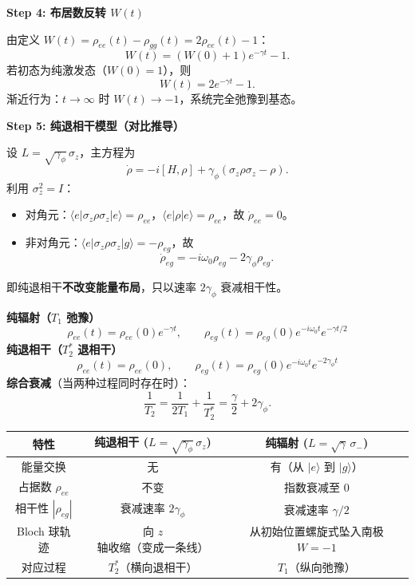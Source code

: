 \begin{derivationbox}[标准解题过程]
\textbf{Step 4: 布居数反转 $W(t)$}

由定义 $W(t) = \rho_{ee}(t) - \rho_{gg}(t) = 2\rho_{ee}(t) - 1$：
\[
W(t) = (W(0)+1)e^{-\gamma t} - 1.
\]
若初态为纯激发态（$W(0)=1$），则
\[
\boxed{W(t) = 2e^{-\gamma t} - 1}.
\]
渐近行为：$t\to\infty$ 时 $W(t)\to -1$，系统完全弛豫到基态。

\textbf{Step 5: 纯退相干模型（对比推导）}

设 $L = \sqrt{\gamma_\phi}\,\sigma_z$，主方程为
\[
\dot{\rho} = -i[H,\rho] + \gamma_\phi\left( \sigma_z \rho \sigma_z - \rho \right).
\]
利用 $\sigma_z^2 = I$：
\begin{itemize}[nosep]
    \item 对角元：$\langle e|\sigma_z \rho \sigma_z|e\rangle = \rho_{ee}$，$\langle e|\rho|e\rangle = \rho_{ee}$，故 $\dot{\rho}_{ee}=0$。
    \item 非对角元：$\langle e|\sigma_z \rho \sigma_z|g\rangle = -\rho_{eg}$，故
    \[
    \dot{\rho}_{eg} = -i\omega_0\rho_{eg} - 2\gamma_\phi\rho_{eg}.
    \]
\end{itemize}
即纯退相干\textbf{不改变能量布局}，只以速率 $2\gamma_\phi$ 衰减相干性。
\end{derivationbox}

\begin{formulabox}[核心结论]
\textbf{纯辐射（$T_1$ 弛豫）}
\[
\rho_{ee}(t) = \rho_{ee}(0)e^{-\gamma t}, \qquad
\rho_{eg}(t) = \rho_{eg}(0)e^{-i\omega_0 t}e^{-\gamma t/2}
\]
\textbf{纯退相干（$T_2^*$ 退相干）}
\[
\rho_{ee}(t) = \rho_{ee}(0), \qquad
\rho_{eg}(t) = \rho_{eg}(0)e^{-i\omega_0 t}e^{-2\gamma_\phi t}
\]
\textbf{综合衰减}（当两种过程同时存在时）：
\[
\frac{1}{T_2} = \frac{1}{2T_1} + \frac{1}{T_2^*}
= \frac{\gamma}{2} + 2\gamma_\phi.
\]
\end{formulabox}

\begin{center}
\renewcommand{\arraystretch}{1.4}
\begin{tabular}{|c|c|c|}
\hline
\textbf{特性} & \textbf{纯退相干} ($L=\sqrt{\gamma_\phi}\,\sigma_z$) & \textbf{纯辐射} ($L=\sqrt{\gamma}\,\sigma_-$) \\
\hline
能量交换 & 无 & 有（从 $|e\rangle$ 到 $|g\rangle$） \\
\hline
占据数 $\rho_{ee}$ & 不变 & 指数衰减至 0 \\
\hline
相干性 $|\rho_{eg}|$ & 衰减速率 $2\gamma_\phi$ & 衰减速率 $\gamma/2$ \\
\hline
Bloch 球轨迹 & 向 $z$ 轴收缩（变成一条线） & 从初始位置螺旋式坠入南极 $W=-1$ \\
\hline
对应过程 & $T_2^*$（横向退相干） & $T_1$（纵向弛豫） \\
\hline
\end{tabular}
\end{center}

